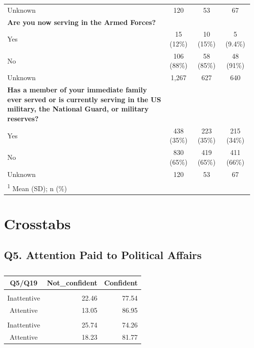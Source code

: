 \documentclass[
  11pt,
  a4paper,
]{article}
\begin{document}
\begin{longtable}[l]{lccc}
\hspace{1em}Unknown & 120 & 53 & \vphantom{1} 67\\
\textbf{Are you now serving in the Armed Forces?} &  &  & \\
\hspace{1em}Yes & 15 (12\%) & 10 (15\%) & 5 (9.4\%)\\
\addlinespace
\hspace{1em}No & 106 (88\%) & 58 (85\%) & 48 (91\%)\\
\hspace{1em}Unknown & 1,267 & 627 & 640\\
\textbf{Has a member of your immediate family ever served or is currently serving in the US military, the National Guard, or military reserves?} &  &  & \\
\hspace{1em}Yes & 438 (35\%) & 223 (35\%) & 215 (34\%)\\
\hspace{1em}No & 830 (65\%) & 419 (65\%) & 411 (66\%)\\
\addlinespace
\hspace{1em}Unknown & 120 & 53 & 67\\
\bottomrule
\multicolumn{4}{l}{\rule{0pt}{1em}\textsuperscript{1} Mean (SD); n (\%)}\\

\end{longtable}

\endgroup{}

\section{Crosstabs}\label{crosstabs}

\subsection{Q5. Attention Paid to Political
Affairs}\label{q5.-attention-paid-to-political-affairs}

\begingroup
\fontsize{12.0pt}{14.4pt}\selectfont

\begin{longtable}{crr}

\caption{\label{tbl-q5q19}}

\tabularnewline

\toprule
Q5/Q19 & Not\_confident & Confident \\ 
\midrule\addlinespace[2.5pt]
\multicolumn{3}{l}{{\bfseries Treatment}} \\[2.5pt] 
\midrule\addlinespace[2.5pt]
Inattentive & 22.46 & 77.54 \\ 
Attentive & 13.05 & 86.95 \\ 
\midrule\addlinespace[2.5pt]
\multicolumn{3}{l}{{\bfseries Control}} \\[2.5pt] 
\midrule\addlinespace[2.5pt]
Inattentive & 25.74 & 74.26 \\ 
Attentive & 18.23 & 81.77 \\ 
\bottomrule

\end{longtable}
\end{document}
